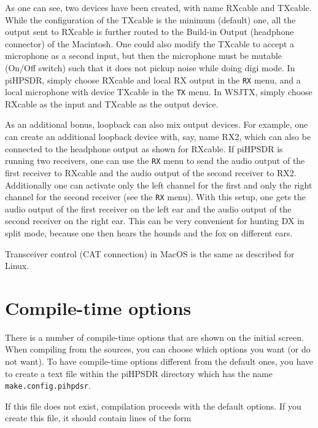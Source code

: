 \documentclass[12pt]{book}
\def\bltt#1{\texttt{\color{blue}#1}}
\def\grtt#1{\texttt{\color{magenta}#1}}
\def\pH{pi\-HPSDR\xspace}
\begin{document}
As one can see, two devices have been created, with name RXcable and TXcable.
While the configuration of the TXcable is the minimum (default) one, all the
output sent to RXcable is further routed to the Build-in Output (headphone
connector) of the Macintosh. One could also modify the TXcable to accept a
microphone as a second input, but then the microphone must be mutable
(On/Off switch) such that it does not pickup noise while doing digi mode.
In \pH, simply choose RXcable and local RX output in the \bltt{RX} menu,
and a local microphone with device TXcable in the \bltt{TX} menu. In WSJTX,
simply choose RXcable as the input and TXcable as the output device.

As an additional bonus, loopback can also mix output devices. For example, one can create
an additional loopback device with, say, name RX2, which can also be connected to
the headphone output as shown for RXcable. If \pH is running two receivers,
one can use the \bltt{RX} menu to send the audio output of the first receiver to RXcable
and the audio output of the second receiver to RX2. Additionally one can activate only
the left channel for the first and only the right channel for the second receiver
(see the \bltt{RX} menu). With this setup,
one gets the audio output of the first receiver on the left ear and the audio output of
the second receiver on the right ear. This can be very convenient for hunting DX in split mode,
because one then hears the hounds and the fox on different ears.

Transceiver control (CAT connection) in MacOS is the same as described for Linux.

\chapter{Compile-time options}
\label{sec:compiletime}

There is a number of compile-time options that are shown on the initial screen.
When compiling from the sources, you can choose which options you want (or do not want).
To have compile-time options different from the default ones, you have to create a text
file within the \pH directory which has the name \grtt{make.config.pihpdsr}.

If this file does not exist, compilation proceeds with the default options.
If you create this file, it should contain lines of the form
\end{document}

